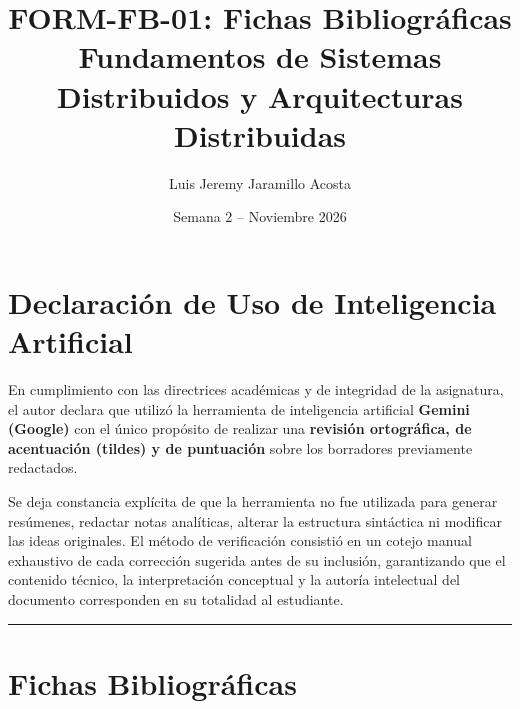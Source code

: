 \documentclass[11pt,a4paper]{article}
\title{\textbf{FORM-FB-01: Fichas Bibliográficas}\\ \large Fundamentos de Sistemas Distribuidos y Arquitecturas Distribuidas}
\author{Luis Jeremy Jaramillo Acosta}
\date{Semana 2 -- Noviembre 2026}
\begin{document}
\maketitle

\section*{Declaración de Uso de Inteligencia Artificial}
En cumplimiento con las directrices académicas y de integridad de la asignatura, el autor declara que utilizó la herramienta de inteligencia artificial \textbf{Gemini (Google)} con el único propósito de realizar una \textbf{revisión ortográfica, de acentuación (tildes) y de puntuación} sobre los borradores previamente redactados.

Se deja constancia explícita de que la herramienta no fue utilizada para generar resúmenes, redactar notas analíticas, alterar la estructura sintáctica ni modificar las ideas originales. El método de verificación consistió en un cotejo manual exhaustivo de cada corrección sugerida antes de su inclusión, garantizando que el contenido técnico, la interpretación conceptual y la autoría intelectual del documento corresponden en su totalidad al estudiante.

\vspace{0.3cm}
\hrule
\vspace{0.4cm}

\section*{Fichas Bibliográficas}
\end{document}
